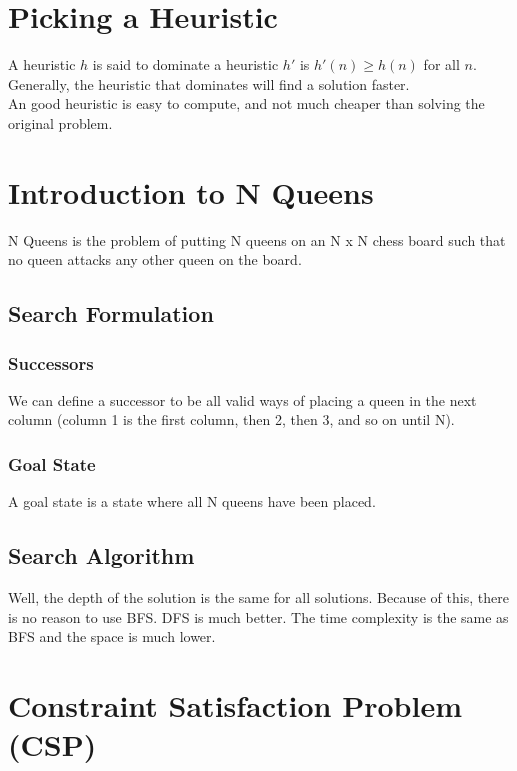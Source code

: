 \documentclass[letterpaper]{article} %
\begin{document}
\section{Picking a Heuristic}

A heuristic $h$ is said to dominate a heuristic $h'$ is $h'(n) \geq h(n)$ for all $n$. Generally, the heuristic that dominates will find a solution faster.\\

An good heuristic is easy to compute, and not much cheaper than solving the original problem.

\section{Introduction to N Queens}

N Queens is the problem of putting N queens on an N x N chess board such that no queen attacks any other queen on the board.

\subsection{Search Formulation}

\subsubsection{Successors}

We can define a successor to be all valid ways of placing a queen in the next column (column 1 is the first column, then 2, then 3, and so on until N).

\subsubsection{Goal State}

A goal state is a state where all N queens have been placed.

\subsection{Search Algorithm}

Well, the depth of the solution is the same for all solutions. Because of this, there is no reason to use BFS. DFS is much better. The time complexity is the same as BFS and the space is much lower.

\section{Constraint Satisfaction Problem (CSP)}
\end{document}
